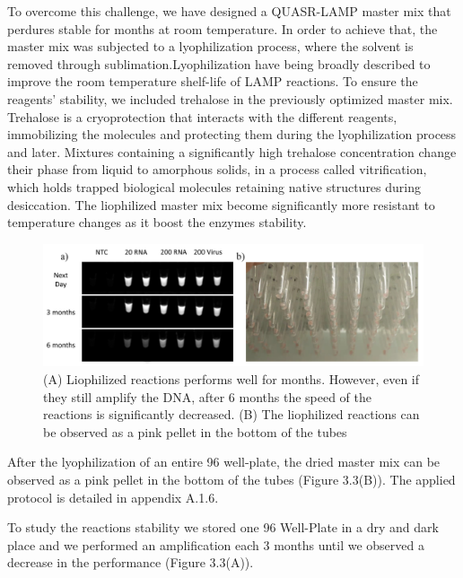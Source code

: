 To overcome this challenge, we have designed a QUASR-LAMP master mix that perdures stable for months at room temperature. In order to achieve that, the master mix was subjected to a lyophilization process, where the solvent is removed through sublimation.Lyophilization have being broadly described to improve the room temperature shelf-life of LAMP reactions\cite{hayashida_direct_2015}\cite{garcia-bernalt_diego_progress_2019}. To ensure the reagents' stability, we included trehalose in the previously optimized master mix. Trehalose is a cryoprotection that interacts with the different reagents, immobilizing the molecules and protecting them during the lyophilization process and later. Mixtures containing a significantly high trehalose concentration change their phase from liquid to amorphous solids, in a process called vitrification, which holds trapped biological molecules retaining native structures during desiccation\cite{hayashida_direct_2015}. The liophilized master mix become significantly more resistant to temperature changes as it boost the enzymes stability.
 
 \begin{figure}[hb]
    \centering
    \includegraphics[width=1\textwidth]{figures/liophilization.jpg}
    \caption[CoronaDetective liophilization results.]{(A) Liophilized reactions performs well for months. However, even if they still amplify the DNA, after 6 months the speed of the reactions is significantly decreased. (B) The liophilized reactions can be observed as a pink pellet in the bottom of the tubes}
    \label{liophilization}
\end{figure}

After the lyophilization of an entire 96 well-plate, the dried master mix can be observed as a pink pellet in the bottom of the tubes (Figure 3.3(B)). The applied protocol is detailed in appendix A.1.6. 

To study the reactions stability we stored one 96 Well-Plate in a dry and dark place and we performed an amplification each 3 months until we observed a decrease in the performance (Figure 3.3(A)).

